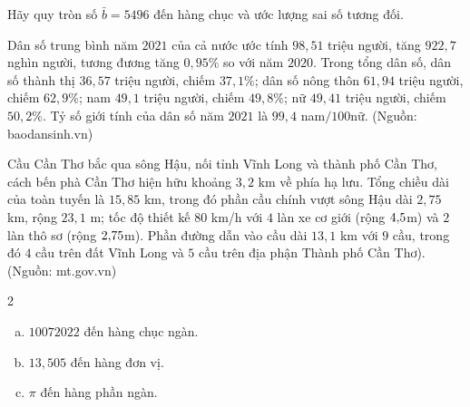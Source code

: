 \begin{bt}%
	Hãy quy tròn số $\bar{b}=5496$ đến hàng chục và ước lượng sai số tương đối.	
\end{bt}

\begin{bt}%
	Dân số trung bình năm $2021$ của cả nước ước tính $98{,}51$ triệu người, tăng $922{,}7$ nghìn người, tương đương tăng $0{,}95\%$ so với năm $2020$. Trong tổng dân số, dân số thành thị $36{,}57$ triệu người, chiếm $37{,}1\%$; dân số nông thôn $61{,}94$ triệu người, chiếm $62{,}9\%$; nam $49{,}1$ triệu người, chiếm $49{,}8\%$; nữ $49{,}41$ triệu người, chiếm $50{,}2\%$. Tỷ số giới tính của dân số năm $2021$ là $99{,}4$ nam$/100$nữ. (Nguồn: baodansinh.vn)
\end{bt}

\begin{bt}%
	Cầu Cần Thơ bắc qua sông Hậu, nối tỉnh Vĩnh Long và thành phố Cần Thơ, cách bến phà Cần Thơ hiện hữu khoảng $3{,}2$ km về phía hạ lưu. Tổng chiều dài của toàn tuyến là $15{,}85$ km, trong đó phần cầu chính vượt sông Hậu dài $2{,}75$ km, rộng $23{,}1$ m; tốc độ thiết kế $80$ km/h với $4$ làn xe cơ giới (rộng $4\time3{,}5$m) và $2$ làn thô sơ (rộng $2\time2{,}75$m). Phần đường dẫn vào cầu dài $13{,}1$ km với $9$ cầu, trong đó $4$ cầu trên đất Vĩnh Long và $5$ cầu trên địa phận Thành phố Cần Thơ). (Nguồn: mt.gov.vn)
\end{bt}

\begin{bt}%
	\begin{multicols}{2}
	\begin{enumerate}[a)]
		\item $10072022$ đến hàng chục ngàn.
		\item $13{,}505$ đến hàng đơn vị.
		\item $\pi$ đến hàng phần ngàn.
	\end{enumerate}
	\end{multicols}
\end{bt}

